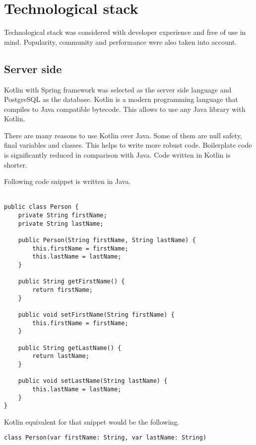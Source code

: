 
\section{Technological stack}\label{sec:technological-stack}

Technological stack was considered with developer experience and free of use in mind.
Popularity, community and performance were also taken into account.

\subsection{Server side}\label{subsec:ts-server-side}

Kotlin with Spring framework was selected as the server side language and PostgreSQL as the database.\cite{kotlin, spring, postgresql}
Kotlin is a modern programming language that compiles to Java compatible bytecode.
This allows to use any Java library with Kotlin.

There are many reasons to use Kotlin over Java.
Some of them are null safety, final variables and classes.
This helps to write more robust code.
Boilerplate code is significantly reduced in comparison with Java.
Code written in Kotlin is shorter.

Following code snippet is written in Java.\\
\\
\begin{Verbatim}[frame=single]
public class Person {
    private String firstName;
    private String lastName;

    public Person(String firstName, String lastName) {
        this.firstName = firstName;
        this.lastName = lastName;
    }

    public String getFirstName() {
        return firstName;
    }

    public void setFirstName(String firstName) {
        this.firstName = firstName;
    }

    public String getLastName() {
        return lastName;
    }

    public void setLastName(String lastName) {
        this.lastName = lastName;
    }
}
\end{Verbatim}

Kotlin equivalent for that snippet would be the following.\\
\begin{Verbatim}[frame=single]
class Person(var firstName: String, var lastName: String)
\end{Verbatim}

